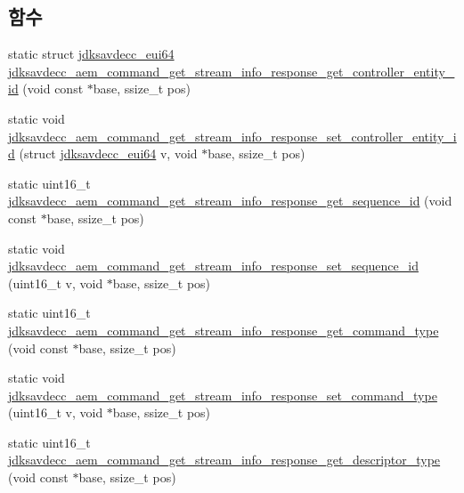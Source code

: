 \subsection*{함수}
\begin{DoxyCompactItemize}
\item 
static struct \hyperlink{structjdksavdecc__eui64}{jdksavdecc\+\_\+eui64} \hyperlink{group__command__get__stream__info__response_gafd86abf80736f08b46b78bd646b3d07b}{jdksavdecc\+\_\+aem\+\_\+command\+\_\+get\+\_\+stream\+\_\+info\+\_\+response\+\_\+get\+\_\+controller\+\_\+entity\+\_\+id} (void const $\ast$base, ssize\+\_\+t pos)
\item 
static void \hyperlink{group__command__get__stream__info__response_gafe43b2acf5fd42cc652f316b8cc212b4}{jdksavdecc\+\_\+aem\+\_\+command\+\_\+get\+\_\+stream\+\_\+info\+\_\+response\+\_\+set\+\_\+controller\+\_\+entity\+\_\+id} (struct \hyperlink{structjdksavdecc__eui64}{jdksavdecc\+\_\+eui64} v, void $\ast$base, ssize\+\_\+t pos)
\item 
static uint16\+\_\+t \hyperlink{group__command__get__stream__info__response_gab46e61194550c71bef8ab4ba1e5f61c5}{jdksavdecc\+\_\+aem\+\_\+command\+\_\+get\+\_\+stream\+\_\+info\+\_\+response\+\_\+get\+\_\+sequence\+\_\+id} (void const $\ast$base, ssize\+\_\+t pos)
\item 
static void \hyperlink{group__command__get__stream__info__response_gadd812cff372ef20b39bba06f03d5a829}{jdksavdecc\+\_\+aem\+\_\+command\+\_\+get\+\_\+stream\+\_\+info\+\_\+response\+\_\+set\+\_\+sequence\+\_\+id} (uint16\+\_\+t v, void $\ast$base, ssize\+\_\+t pos)
\item 
static uint16\+\_\+t \hyperlink{group__command__get__stream__info__response_ga8102dd42e923cd19334d8febb83c420a}{jdksavdecc\+\_\+aem\+\_\+command\+\_\+get\+\_\+stream\+\_\+info\+\_\+response\+\_\+get\+\_\+command\+\_\+type} (void const $\ast$base, ssize\+\_\+t pos)
\item 
static void \hyperlink{group__command__get__stream__info__response_gaf3fce81e0a3318ce250b0ae8ff08046b}{jdksavdecc\+\_\+aem\+\_\+command\+\_\+get\+\_\+stream\+\_\+info\+\_\+response\+\_\+set\+\_\+command\+\_\+type} (uint16\+\_\+t v, void $\ast$base, ssize\+\_\+t pos)
\item 
static uint16\+\_\+t \hyperlink{group__command__get__stream__info__response_ga8a6c2cdf1f47400b5e7802d1a3377f56}{jdksavdecc\+\_\+aem\+\_\+command\+\_\+get\+\_\+stream\+\_\+info\+\_\+response\+\_\+get\+\_\+descriptor\+\_\+type} (void const $\ast$base, ssize\+\_\+t pos)
\item 

\end{DoxyCompactItemize}
